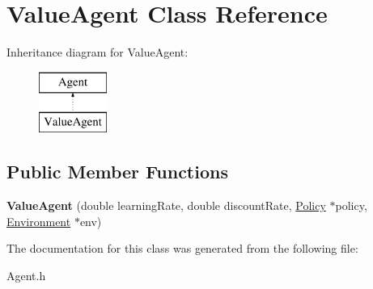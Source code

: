 \hypertarget{class_value_agent}{}\section{Value\+Agent Class Reference}
\label{class_value_agent}
Inheritance diagram for Value\+Agent\+:\begin{figure}[H]
\begin{center}
\leavevmode
\includegraphics[height=2.000000cm]{class_value_agent}
\end{center}
\end{figure}
\subsection*{Public Member Functions}
\begin{DoxyCompactItemize}
\item 
\mbox{\label{class_value_agent_ac1e6c8a5fba492df7323306bb69cc0f9}} 
{\bfseries Value\+Agent} (double learning\+Rate, double discount\+Rate, \mbox{\hyperlink{class_policy}{Policy}} $\ast$policy, \mbox{\hyperlink{class_environment}{Environment}} $\ast$env)
\end{DoxyCompactItemize}


The documentation for this class was generated from the following file\+:\begin{DoxyCompactItemize}
\item 
Agent.\+h\end{DoxyCompactItemize}
